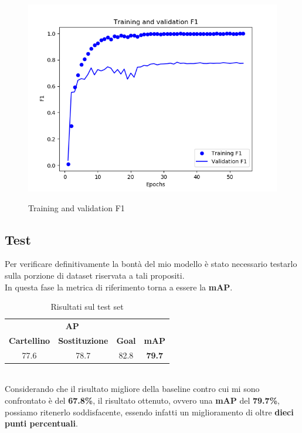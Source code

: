 \begin{figure}[H]
\centering
\caption{Training and validation F1}
\includegraphics[width=\linewidth]{img/training-validation-F1.png}
\label{figure : trainingvalf1}
\end{figure}
\subsection{Test}
Per verificare definitivamente la bontà del mio modello è stato necessario testarlo sulla porzione di dataset riservata a tali propositi. 
\\In questa fase la metrica di riferimento torna a essere la \textbf{mAP}.
\begin{table}[ht]
\label{table: test}
\caption{Risultati sul test set}
\centering
\begin{tabular}{c|c|c||c}
\multicolumn{3}{c}{\textbf{AP}}\\
\textbf{Cartellino} & \textbf{Sostituzione} & \textbf{Goal} & \textbf{mAP} \\
\hline
77.6& 78.7 & 82.8 & \textbf{79.7} \\ [1ex]
\end{tabular}
\end{table}
\\Considerando che il risultato migliore della baseline contro cui mi sono confrontato è del \textbf{67.8\%}, il risultato ottenuto, ovvero una \textbf{mAP} del \textbf{79.7\%}, possiamo ritenerlo soddisfacente, essendo infatti un miglioramento di oltre \textbf{dieci punti percentuali}.
